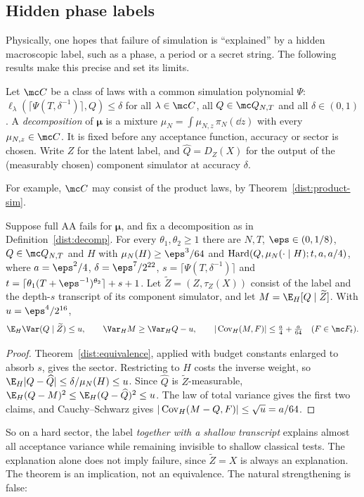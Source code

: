 \subsection{Hidden phase labels}\label{dist:phase}
Physically, one hopes that failure of simulation is ``explained'' by a hidden
macroscopic label, such as a phase, a period or a secret string. The following
results make this precise and set its limits.

\begin{definition}\label{dist:decomp}
Let \(\mc C\) be a class of laws with a common simulation polynomial \(\Psi\):
\(\ell_\lambda(\lceil\Psi(T,\delta^{-1})\rceil,Q)\le\delta\) for all
\(\lambda\in\mc C\), all \(Q\in\mc Q_{N,T}\) and all \(\delta\in(0,1)\). A
\emph{decomposition} of \(\boldsymbol\mu\) is a mixture
\(\mu_N=\int\mu_{N,z}\,\pi_N(\dd z)\) with every \(\mu_{N,z}\in\mc C\). It is
fixed before any acceptance function, accuracy or sector is chosen. Write \(Z\)
for the latent label, and \(\widehat Q=D_Z(X)\) for the output of the
(measurably chosen) component simulator at accuracy \(\delta\).
\end{definition}
For example, \(\mc C\) may consist of the product laws, by
Theorem~\ref{dist:product-sim}.

\begin{theorem}\label{dist:phase-converse}
Suppose full AA fails for \(\boldsymbol\mu\), and fix a decomposition as in
Definition~\ref{dist:decomp}. For every \(\theta_1,\theta_2\ge1\) there are
\(N,T\), \(\eps\in(0,1/8)\), \(Q\in\mc Q_{N,T}\) and \(H\) with
\(\mu_N(H)\ge\eps^3/64\) and \(\operatorname{Hard}(Q,\mu_N(\cdot\mid H);t,a,a/4)\), where
\(a=\eps^2/4\), \(\delta=\eps^7/2^{22}\),
\(s=\lceil\Psi(T,\delta^{-1})\rceil\) and
\(t=\lceil\theta_1(T+\eps^{-1})^{\theta_2}\rceil+s+1\). Let
\(\widetilde Z=(Z,\tau_Z(X))\) consist of the label and the depth-\(s\)
transcript of its component simulator, and let \(M=\E_H[Q\mid\widetilde Z]\).
With \(u=\eps^4/2^{16}\),
\[
 \E_H\Var(Q\mid\widetilde Z)\le u,\qquad
 \Var_HM\ge\Var_HQ-u,\qquad
 |\Cov_H(M,F)|\le\tfrac{a}{4}+\tfrac{a}{64}\quad(F\in\mc F_t).
\]
\end{theorem}
\begin{proof}
Theorem~\ref{dist:equivalence}, applied with budget constants enlarged to absorb
\(s\), gives the sector. Restricting to \(H\) costs the inverse weight, so
\(\E_H|Q-\widehat Q|\le\delta/\mu_N(H)\le u\). Since \(\widehat Q\) is
\(\widetilde Z\)-measurable,
\(\E_H(Q-M)^2\le\E_H(Q-\widehat Q)^2\le u\). The law of total variance gives the
first two claims, and Cauchy--Schwarz gives
\(|\operatorname{Cov}_H(M-Q,F)|\le\sqrt u=a/64\).
\end{proof}
So on a hard sector, the label \emph{together with a shallow transcript}
explains almost all acceptance variance while remaining invisible to shallow
classical tests. The explanation alone does not imply failure, since
\(\widetilde Z=X\) is always an explanation. The theorem is an implication, not
an equivalence. The natural strengthening is false:

